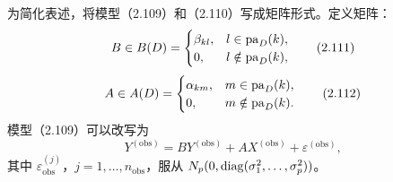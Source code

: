 为简化表述，将模型（2.109）和（2.110）写成矩阵形式。定义矩阵：
\begin{equation}
B\in B(D)=
\begin{cases}
\beta_{kl},&l\in\mathrm{pa}_D(k),\\
0,&l\notin\mathrm{pa}_D(k),
\end{cases}
\tag{2.111}
\end{equation}
\begin{equation}
A\in A(D)=
\begin{cases}
\alpha_{km},&m\in\mathrm{pa}_D(k),\\
0,&m\notin\mathrm{pa}_D(k).
\end{cases}
\tag{2.112}
\end{equation}
模型（2.109）可以改写为
\begin{equation}
Y^{(\mathrm{obs})}=BY^{(\mathrm{obs})}+AX^{(\mathrm{obs})}
+\varepsilon^{(\mathrm{obs})},
\tag{2.113}
\end{equation}
其中 $\varepsilon_{\mathrm{obs}}^{(j)}$，$j=1,\ldots,n_{\mathrm{obs}}$，服从 $N_p(0,\operatorname{diag}(\sigma_1^2,\ldots,\sigma_p^2))$。

